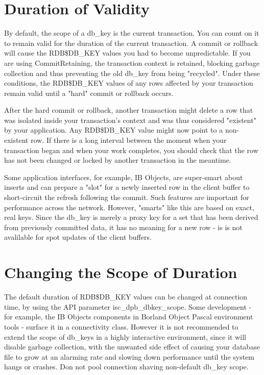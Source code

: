\documentclass[a4paper,12pt,oneside]{book}
\begin{document}
\section{Duration of Validity}
By default, the scope of a db\_key is the current transaction. You can count on it to remain 
valid for the duration of the current transaction. A commit or rollback will cause the RDB\$DB\_KEY
values you had to become unpredictable. If you are using CommitRetaining, the transaction context 
is retained, blocking garbage collection and thus preventing the old db\_key from being "recycled".
Under these conditions, the RDB\$DB\_KEY values of any rows affected by your transaction remain 
valid until a "hard" commit or rollback occurs.

After the hard commit or rollback, another transaction might delete a row that was isolated 
inside your transaction's context and was thus considered "existent" by your application. Any
RDB\$DB\_KEY value might now point to a non-existent row. If there is a long interval between the 
moment when your transaction began and when your work completes, you should check that the row 
has not been changed or locked by another transaction in the meantime.

Some application interfaces, for example, IB Objects, are super-smart about inserts and can 
prepare a "slot" for a newly inserted row in the client buffer to short-circuit the refresh 
following the commit. Such features are important for performance across the network. However, 
"smarts" like this are based on exact, real keys. Since the db\_key is merely a proxy key for 
a set that has been derived from previously committed data, it has no meaning for a new row - 
is is not avalilable for spot updates of the client buffers.

\section{Changing the Scope of Duration}
The default duration of RDB\$DB\_KEY values can be changed at connection time, by using the 
API parameter isc\_dpb\_dbkey\_scope. Some development - for example, the IB Objects components 
in Borland Object Pascal environment tools - surface it in a connectivity class. However it is 
not recommended to extend the scope of db\_keys in a highly interactive environment, since it 
will disable garbage collection, with the unwanted side effect of causing your database file 
to grow at an alarming rate and slowing down performance until the system hangs or crashes. 
Don not pool connection shaving non-default db\_key scope.
\end{document}

